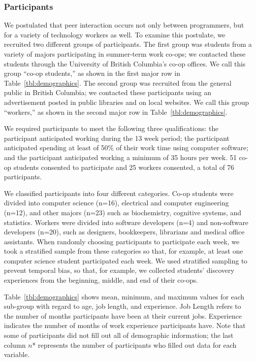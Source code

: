 \documentclass[smallextended]{svjour3}
\newcommand\discovery{peer interaction\xspace}
\begin{document}
\subsubsection{Participants}
 
\noindent
We postulated that \discovery occurs not only between programmers,
but for a variety of technology workers as well.
To examine this postulate, we recruited two different groups of participants.
The first group was students from a variety of majors participating 
in summer-term work co-ops; we contacted
these students through the University of British Columbia's co-op offices.
We call this group ``co-op students,'' as shown in the first major row in
Table~\ref{tbl:demographics}.
The second group was recruited from the general public in British Columbia;
we contacted these participants using an advertisement posted in public libraries 
and on local websites.
We call this group ``workers,'' as shown in the second major row in
Table~\ref{tbl:demographics}.

We required participants to meet the following three qualifications:
the participant anticipated working during the 13 week period;
the participant anticipated spending at least of 50\% of their work time using computer software;
and the participant anticipated working a minimum of 35 hours per week. 
51 co-op students consented to participate and 25 workers consented,
a total of 76 participants.

We classified participants into four different categories.
Co-op students were divided into computer science (n=16),
electrical and computer engineering (n=12), 
and other majors (n=23) such as biochemistry, cognitive systems, and statistics.
Workers were divided into software developers (n=4) and 
non-software developers (n=20), such as designers, bookkeepers, librarians and medical office assistants.
When randomly choosing participants to participate each week, we took a stratified
sample from these categories so that, for example,
at least one computer science student participated each week. 
We used stratified sampling to prevent temporal bias, so that, for example,
we collected students' discovery experiences from the beginning, middle, and
end of their co-ops.

Table~\ref{tbl:demographics} shows mean, minimum, and maximum values for each sub-group with regard to age, job length, and experience. 
Job Length refers to the number of months participants have been at
their current jobs.
Experience indicates the number of months of work experience participants have.
Note that some of participants did not fill out all of demographic information;
the last column $n$* represents the number of participants who filled out data for each variable. 
  
\end{document}
